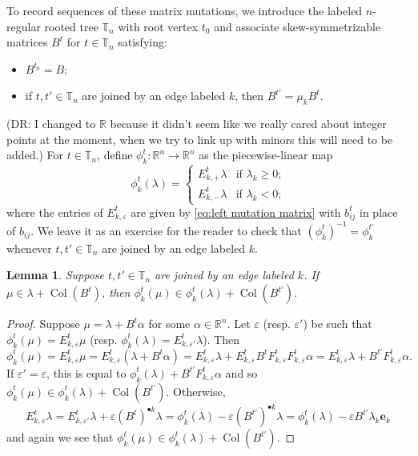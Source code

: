 \documentclass{amsart}
\newtheorem{lemma}[theorem]{Lemma}
\numberwithin{theorem}{section}
\newcommand{\RR}{\mathbb{R}}
\newcommand{\TT}{\mathbb{T}}
\newcommand{\Col}{\operatorname{Col}}
\begin{document}
  To record sequences of these matrix mutations, we introduce the labeled $n$-regular rooted tree $\TT_n$ with root vertex $t_0$ and associate skew-symmetrizable matrices $B^t$ for $t\in\TT_n$ satisfying:
  \begin{itemize}
    \item $B^{t_0}=B$;
    \item if $t,t'\in\TT_n$ are joined by an edge labeled $k$, then $B^{t'}=\mu_k B^t$.
  \end{itemize}

  (DR: I changed to $\RR$ because it didn't seem like we really cared about integer points at the moment, when we try to link up with minors this will need to be added.)
  For $t\in\TT_n$, define $\phi^t_k:\RR^n\to\RR^n$ as the piecewise-linear map
  \[\phi^t_k(\lambda)=\begin{cases} E^t_{k,+}\lambda & \text{if $\lambda_k\ge0$;}\\ E^t_{k,-}\lambda & \text{if $\lambda_k<0$;} \end{cases}\]
  where the entries of $E^t_{k,\varepsilon}$ are given by \eqref{eq:left mutation matrix} with $b^t_{ij}$ in place of $b_{ij}$.
  We leave it as an exercise for the reader to check that $(\phi^t_k)^{-1}=\phi^{t'}_k$ whenever $t,t'\in\TT_n$ are joined by an edge labeled $k$.
  \begin{lemma}
    Suppose $t,t'\in\TT_n$ are joined by an edge labeled $k$.
    If $\mu\in\lambda+\Col(B^t)$, then $\phi^t_k(\mu)\in\phi^t_k(\lambda)+\Col(B^{t'})$.
  \end{lemma}
  \begin{proof}
    Suppose $\mu=\lambda+B^t\alpha$ for some $\alpha\in\RR^n$.
    Let $\varepsilon$ (resp. $\varepsilon'$) be such that $\phi^t_k(\mu)=E^t_{k,\varepsilon}\mu$ (resp. $\phi^t_k(\lambda)=E^t_{k,\varepsilon'}\lambda$).
    Then 
    \[\phi^t_k(\mu)=E^t_{k,\varepsilon}\mu=E^t_{k,\varepsilon}(\lambda+B^t\alpha)=E^t_{k,\varepsilon}\lambda + E^t_{k,\varepsilon} B^t F^t_{k,\varepsilon} F^t_{k,\varepsilon}\alpha=E^t_{k,\varepsilon}\lambda + B^{t'} F^t_{k,\varepsilon}\alpha.\]
    If $\varepsilon'=\varepsilon$, this is equal to $\phi^t_k(\lambda) + B^{t'} F^t_{k,\varepsilon}\alpha$ and so $\phi^t_k(\mu)\in\phi^t_k(\lambda)+\Col(B^{t'})$.
    Otherwise, 
    \[E^t_{k,\varepsilon}\lambda=E^t_{k,\varepsilon'}\lambda+\varepsilon(B^t)^{\bullet k}\lambda=\phi^t_k(\lambda)-\varepsilon(B^{t'})^{\bullet k}\lambda=\phi^t_k(\lambda)-\varepsilon B^{t'} \lambda_k \mathbf{e}_k\]
    and again we see that $\phi^t_k(\mu)\in\phi^t_k(\lambda)+\Col(B^{t'})$.
  \end{proof}
\end{document}
